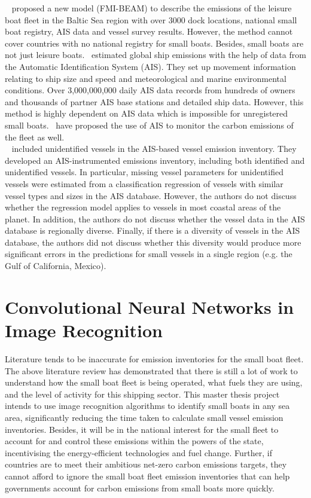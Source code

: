 ~ proposed a new model (FMI-BEAM) to describe the emissions of the leisure boat fleet in the Baltic Sea region with over 3000 dock locations, national small boat registry, AIS data and vessel survey results. However, the method cannot cover countries with no national registry for small boats. Besides, small boats are not just leisure boats.~ estimated global ship emissions with the help of data from the Automatic Identification System (AIS). They set up movement information relating to ship size and speed and meteorological and marine environmental conditions. Over 3,000,000,000 daily AIS data records from hundreds of owners and thousands of partner AIS base stations and detailed ship data. However, this method is highly dependent on AIS data which is impossible for unregistered small boats.~ have proposed the use of AIS to monitor the carbon emissions of the fleet as well.\\

~ included unidentified vessels in the AIS-based vessel emission inventory. They developed an AIS-instrumented emissions inventory, including both identified and unidentified vessels. In particular, missing vessel parameters for unidentified vessels were estimated from a classification regression of vessels with similar vessel types and sizes in the AIS database. However, the authors do not discuss whether the regression model applies to vessels in most coastal areas of the planet. In addition, the authors do not discuss whether the vessel data in the AIS database is regionally diverse. Finally, if there is a diversity of vessels in the AIS database, the authors did not discuss whether this diversity would produce more significant errors in the predictions for small vessels in a single region (e.g. the Gulf of California, Mexico).


\section{Convolutional Neural Networks in Image Recognition}
\label{sec2.2}
Literature tends to be inaccurate for emission inventories for the small boat fleet. The above literature review has demonstrated that there is still a lot of work to understand how the small boat fleet is being operated, what fuels they are using, and the level of activity for this shipping sector. This master thesis project intends to use image recognition algorithms to identify small boats in any sea area, significantly reducing the time taken to calculate small vessel emission inventories. Besides, it will be in the national interest for the small fleet to account for and control these emissions within the powers of the state, incentivising the energy-efficient technologies and fuel change. Further, if countries are to meet their ambitious net-zero carbon emissions targets, they cannot afford to ignore the small boat fleet emission inventories that can help governments account for carbon emissions from small boats more quickly.\\

